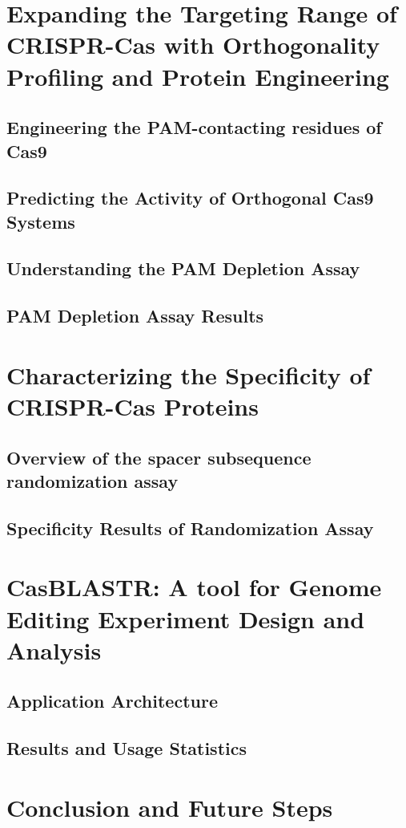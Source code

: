 \documentclass{Dissertate}
\begin{document}
\chapter{Expanding the Targeting Range of CRISPR-Cas with Orthogonality Profiling and Protein Engineering}
\section{Engineering the PAM-contacting residues of Cas9}
\section{Predicting the Activity of Orthogonal Cas9 Systems}
\section{Understanding the PAM Depletion Assay}
\section{PAM Depletion Assay Results}

\chapter{Characterizing the Specificity of CRISPR-Cas Proteins}
\section{Overview of the spacer subsequence randomization assay}
\section{Specificity Results of Randomization Assay}

\chapter{CasBLASTR: A tool for Genome Editing Experiment Design and Analysis}
\section{Application Architecture}
\section{Results and Usage Statistics}

\chapter{Conclusion and Future Steps}

%
%
%
%
%
%    
%
%
\clearpage



%
\end{document}
